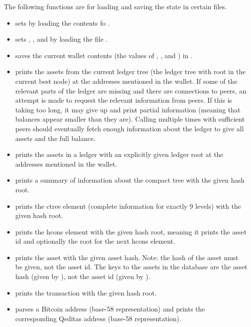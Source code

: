 The following functions are for loading and saving the state in certain files.
\begin{itemize}
\item {} sets {} by loading the contents fo {}.
\item {} sets {}, {},
{}
and {}
by loading the file {}.
\item {} saves the current wallet contents
(the values of {}, {},
{}
and {})
in {}.
\item {} prints the assets from the current ledger tree (the ledger tree with root in the current best node) at the addresses
mentioned in the wallet.
If some of the relevant parts of the ledger are missing and there are connections to peers, an attempt is made to request
the relevant information from peers. If this is taking too long, it may give up and print partial information
(meaning that balances appear smaller than they are).
Calling {} multiple times with sufficient peers should eventually fetch enough information about the
ledger to give all assets and the full balance.
\item {} prints the assets in a ledger with an explicitly given ledger root
at the addresses mentioned in the wallet.
\item {} prints a summary of information about the compact tree with the given hash root.
\item {} prints the ctree element (complete information for exactly 9 levels) with the given hash root.
\item {} prints the hcons element with the given hash root, meaning it prints the asset id and optionally the root for the next hcons element.
\item {} prints the asset with the given asset hash. Note: the hash of the asset must be given, not the asset id. The keys to the assets in the database are the asset hash (given by {}), not the asset id (given by {}).
\item {} prints the transaction with the given hash root.
\item {} parses a Bitcoin address (base-58 representation) and prints the corresponding Qeditas address (base-58 representation).

\end{itemize}
